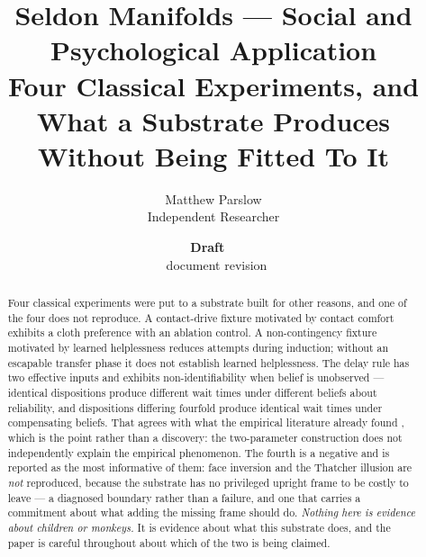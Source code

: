 \documentclass[11pt,a4paper]{article}
\title{Seldon Manifolds --- Social and Psychological Application\\\large Four Classical Experiments, and What a Substrate Produces Without Being Fitted To It}
\author{Matthew Parslow\\Independent Researcher}
\date{\textbf{Draft \texorpdfstring{\textemdash}{---}\ \PaperDraft}\\[2pt]\PaperDisplayDate \texorpdfstring{\textbullet}{\textperiodcentered}\ document revision \PaperRevision}
\theoremstyle{remark}
\begin{document}
\maketitle
\begin{center}
\end{center}
\vspace{1em}

\begin{abstract}
Four classical experiments were put to a substrate built for other reasons, and one of the four does
not reproduce. A contact-drive fixture motivated by contact comfort \citep{harlow1958} exhibits a cloth preference with an ablation control. A non-contingency fixture motivated by learned helplessness \citep{seligman1967} reduces attempts during induction; without an escapable transfer phase it does not establish learned helplessness.
The delay rule has two effective inputs and exhibits non-identifiability when belief is unobserved --- identical dispositions produce different wait
times under different beliefs about reliability, and dispositions differing fourfold produce
identical wait times under compensating beliefs. That agrees with what the empirical literature
already found \citep{kidd2013,watts2018}, which is the point rather than a discovery: the two-parameter construction does not independently explain the empirical phenomenon. The fourth is a negative and is reported as the most informative of them: face inversion
\citep{yin1969} and the Thatcher illusion \citep{thompson1980} are \emph{not} reproduced, because the
substrate has no privileged upright frame to be costly to leave --- a diagnosed boundary rather than a
failure, and one that carries a commitment about what adding the missing frame should do.
\emph{Nothing here is evidence about children or monkeys.} It is evidence about what this substrate
does, and the paper is careful throughout about which of the two is being claimed.
\end{abstract}
\end{document}
